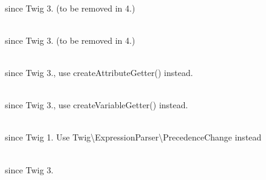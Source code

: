 \begin{DoxyRefList}
\item[{\parbox[t]{\linewidth}{Global(e) \doxylink{class_twig_1_1_node_1_1_expression_1_1_name_expression_a270d6ef7fb3863dbd4d27027b21f6ecb}{Name\+Expression::\+is\+Simple} ()}}]\hfill \\
\label{deprecated__deprecated000033}%
%
since Twig 3. (to be removed in 4.)  
\item[{\parbox[t]{\linewidth}{Global(e) \doxylink{class_twig_1_1_node_1_1_expression_1_1_name_expression_aa7e150f528378b8f7268e1ae27ebb1af}{Name\+Expression::\+is\+Special} ()}}]\hfill \\
\label{deprecated__deprecated000032}%
%
since Twig 3. (to be removed in 4.)  
\item[{\parbox[t]{\linewidth}{Global(e) \doxylink{class_twig_1_1_test_1_1_node_test_case_a45c597a08206da3dd0fa889f8521f1aa}{Node\+Test\+Case::\+get\+Attribute\+Getter} ()}}]\hfill \\
\label{deprecated__deprecated000040}%
%
since Twig 3., use create\+Attribute\+Getter() instead.  
\item[{\parbox[t]{\linewidth}{Global(e) \doxylink{class_twig_1_1_test_1_1_node_test_case_af79fd21776bb5a9a493bf95960e9a545}{Node\+Test\+Case::\+get\+Variable\+Getter} (\$name, \$line=false)}}]\hfill \\
\label{deprecated__deprecated000039}%
%
since Twig 3., use create\+Variable\+Getter() instead.  
\item[{\parbox[t]{\linewidth}{Class \doxylink{class_twig_1_1_operator_precedence_change}{Operator\+Precedence\+Change} }}]\hfill \\
\label{deprecated__deprecated000035}%
%
since Twig 1. Use Twig\textbackslash{}\+Expression\+Parser\textbackslash{}\+Precedence\+Change instead  
\item[{\parbox[t]{\linewidth}{Global(e) \doxylink{class_twig_1_1_parser_ace16df8b342fd0e63669db2a8ea3b060}{Parser::\+get\+Expression\+Parser} ()}}]\hfill \\
\label{deprecated__deprecated000036}%
%
since Twig 3.  
\item[{\parbox[t]{\linewidth}{Global(e) \doxylink{class_twig_1_1_template_a04821dc4a4bb4a563b2f4ac2a73ccccf}{Template::\+load\+Template} (\$template, \$template\+Name=null, ?int \$line=null, ?int \$index=null)}}]\hfill \\

\end{DoxyRefList}
